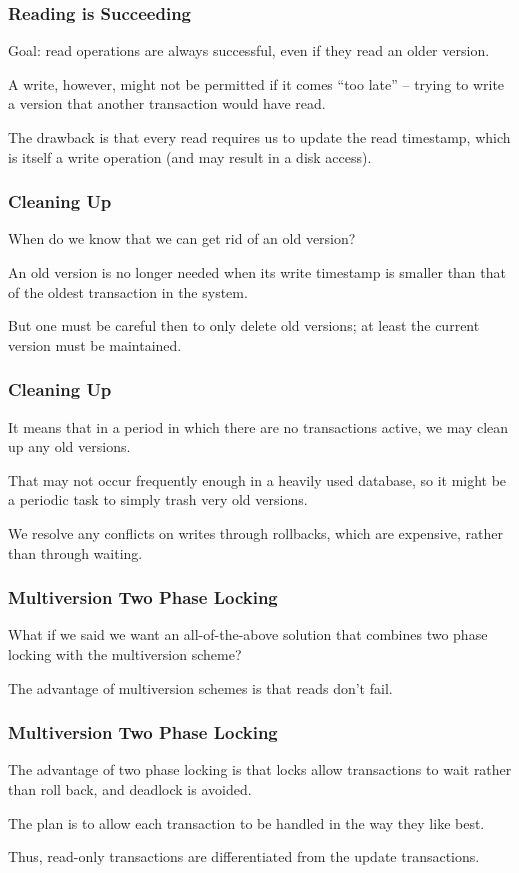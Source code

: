 \begin{frame}
\frametitle{Reading is Succeeding}
Goal: read operations are always successful, even if they read an older version. 

A write, however, might not be permitted if it comes ``too late'' -- trying to write a version that another transaction would have read. 

The drawback is that every read requires us to update the read timestamp, which is itself a write operation (and may result in a disk access).

\end{frame}

\begin{frame}
\frametitle{Cleaning Up}

When do we know that we can get rid of an old version? 

An old version is no longer needed when its write timestamp is smaller than that of the oldest transaction in the system. 

But one must be careful then to only delete old versions; at least the current version must be maintained. 

\end{frame}

\begin{frame}
\frametitle{Cleaning Up}


It means that in a period in which there are no transactions active, we may clean up any old versions. 

That may not occur frequently enough in a heavily used database, so it might be a periodic task to simply trash very old versions.

We resolve any conflicts on writes through rollbacks, which are expensive, rather than through waiting.

\end{frame}

\begin{frame}
\frametitle{Multiversion Two Phase Locking}

What if we said we want an all-of-the-above solution that combines two phase locking with the multiversion scheme? 

The advantage of multiversion schemes is that reads don't fail. 


\end{frame}

\begin{frame}
\frametitle{Multiversion Two Phase Locking}

The advantage of two phase locking is that locks allow transactions to wait rather than roll back, and deadlock is avoided. 

The plan is to allow each transaction to be handled in the way they like best. 

Thus, read-only transactions are differentiated from the update transactions.


\end{frame}



